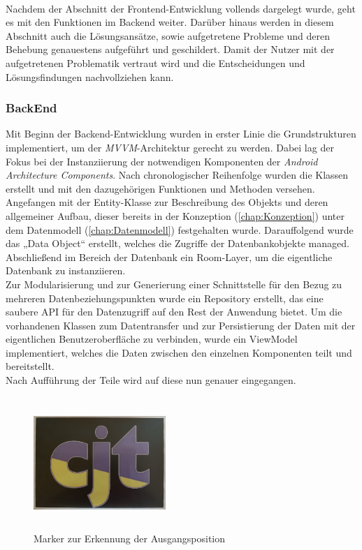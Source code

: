 \pagebreak
\\ 
Nachdem der Abschnitt der Frontend-Entwicklung vollends dargelegt wurde, geht es mit den Funktionen im Backend weiter. Darüber hinaus werden in diesem 
Abschnitt auch die Lösungsansätze, sowie aufgetretene Probleme und deren Behebung genauestens aufgeführt und geschildert. Damit der Nutzer mit der 
aufgetretenen Problematik vertraut wird und die Entscheidungen und Lösungsfindungen nachvollziehen kann. 
\subsubsection{BackEnd}
Mit Beginn der Backend-Entwicklung wurden in erster Linie die Grundstrukturen implementiert, um der \textit{MVVM}-Architektur gerecht zu werden. Dabei lag 
der Fokus bei der Instanziierung der notwendigen Komponenten der \textit{Android Architecture Components}. Nach chronologischer Reihenfolge wurden die Klassen 
erstellt und mit den dazugehörigen Funktionen und Methoden versehen. Angefangen mit der Entity-Klasse zur Beschreibung des Objekts und deren allgemeiner Aufbau, 
dieser bereits in der Konzeption (\ref{chap:Konzeption}) unter dem Datenmodell (\ref{chap:Datenmodell}) festgehalten wurde. Darauffolgend wurde das „Data Object“ 
erstellt, welches die Zugriffe der Datenbankobjekte managed. Abschließend im Bereich der Datenbank ein Room-Layer, um die eigentliche Datenbank zu 
instanziieren. 
\\ 
Zur Modularisierung und zur Generierung einer Schnittstelle für den Bezug zu mehreren Datenbeziehungspunkten wurde ein Repository erstellt, das eine saubere 
\acs{API} für den Datenzugriff auf den Rest der Anwendung bietet. Um die vorhandenen Klassen zum Datentransfer und zur Persistierung der Daten mit der 
eigentlichen Benutzeroberfläche zu verbinden, wurde ein ViewModel implementiert, welches die Daten zwischen den einzelnen Komponenten teilt und bereitstellt. 
\\ 
\linebreak 
Nach Aufführung der Teile wird auf diese nun genauer eingegangen. 
\begin{figure}[hbt!]
    \centering
    \includegraphics[width=5cm,height=5cm,keepaspectratio]{4Umsetzung/Bilder/cjt_logo_tracking.png}
    \caption{Marker zur Erkennung der Ausgangsposition}
    \label{pic:initialMarker}
\end{figure}

